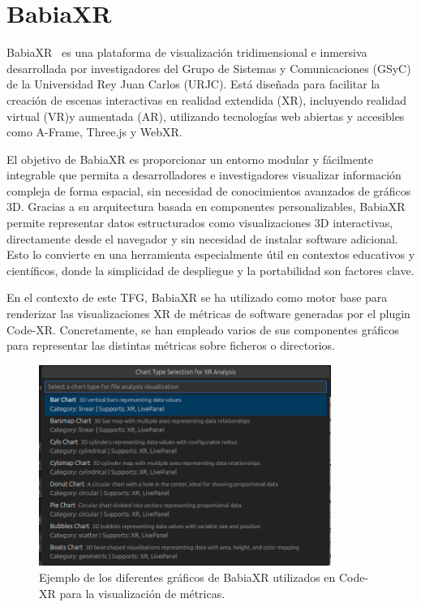\documentclass[a4paper, 12pt]{book}
\begin{document}
\section{BabiaXR}
\label{sec:babiaxr}

BabiaXR~\cite{moreno2022babiaxr} es una plataforma de visualización tridimensional e inmersiva desarrollada por investigadores del Grupo de Sistemas y Comunicaciones (GSyC) de la Universidad Rey Juan Carlos (URJC). Está diseñada para facilitar la creación de escenas interactivas en realidad extendida (XR), incluyendo realidad virtual (VR)y aumentada (AR), utilizando tecnologías web abiertas y accesibles como A-Frame, Three.js y WebXR.

El objetivo de BabiaXR es proporcionar un entorno modular y fácilmente integrable que permita a desarrolladores e investigadores visualizar información compleja de forma espacial, sin necesidad de conocimientos avanzados de gráficos 3D. Gracias a su arquitectura basada en componentes personalizables, BabiaXR permite representar datos estructurados como visualizaciones 3D interactivas, directamente desde el navegador y sin necesidad de instalar software adicional. Esto lo convierte en una herramienta especialmente útil en contextos educativos y científicos, donde la simplicidad de despliegue y la portabilidad son factores clave.

En el contexto de este TFG, BabiaXR se ha utilizado como motor base para renderizar las visualizaciones XR de métricas de software generadas por el plugin Code-XR. Concretamente, se han empleado varios de sus componentes gráficos para representar las distintas métricas sobre ficheros o directorios.

\begin{figure}[H]
    \centering
    \includegraphics[width=0.85\textwidth]{img/graficos_babiaxr.png}
    \caption{Ejemplo de los diferentes gráficos de BabiaXR utilizados en Code-XR para la visualización de métricas.}
    \label{fig:babiaxr-graficos}
\end{figure}
\end{document}
